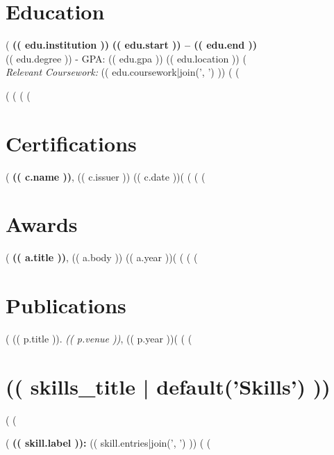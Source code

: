 \documentclass[9pt]{article}
\begin{document}
\section*{Education}
(%
\noindent\textbf{(( edu.institution ))} \hfill \textbf{(( edu.start )) -- (( edu.end ))} \\
(( edu.degree )) - GPA: (( edu.gpa )) \hfill (( edu.location ))
(%
\\
{\textit{Relevant Coursework:} (( edu.coursework|join(', ') ))}
(%
(%

\vspace{0.5em}

(%
(%
(%
(%
\section*{Certifications}
(%
\noindent\textbf{(( c.name ))}, (( c.issuer )) \hfill (( c.date ))(%
(%
(%
(%
\section*{Awards}
(%
\noindent\textbf{(( a.title ))}, (( a.body )) \hfill (( a.year ))(%
(%
(%
(%
\section*{Publications}
(%
\noindent (( p.title )). \textit{(( p.venue ))}, (( p.year ))(%
(%
(%
\section*{(( skills_title | default('Skills') ))}
(%
(%

\vspace{0.5em}

\noindent(%
\textbf{(( skill.label )):} (( skill.entries|join(', ') ))
(%
(%
\end{document}
